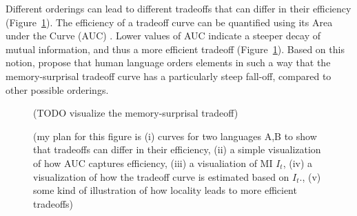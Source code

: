 \documentclass[11pt,letterpaper]{article}
\newcommand{\citet}{\Textcite}
\newcommand\mhahn[1]{{\color{red}(#1)}}
\begin{document}
Different orderings can lead to different tradeoffs that can differ in their efficiency (Figure~\ref{fig:tradeoff}).
The efficiency of a tradeoff curve can be quantified using its Area under the Curve (AUC) \citet{Hahn2020modeling}. Lower values of AUC indicate a steeper decay of mutual information, and thus a more efficient tradeoff (Figure~\ref{fig:tradeoff}).
Based on this notion, \citet{Hahn2020modeling} propose that human language orders elements in such a way that the memory-surprisal tradeoff curve has a particularly steep fall-off, compared to other possible orderings.

\begin{figure}
    \centering
    \mhahn{TODO visualize the memory-surprisal tradeoff}
    \caption{\mhahn{my plan for this figure is (i) curves for two languages A,B to show that tradeoffs can differ in their efficiency, (ii) a simple visualization of how AUC captures efficiency, (iii) a visualiation of MI $I_t$, (iv) a visualization of how the tradeoff curve is estimated based on $I_t$., (v) some kind of illustration of how locality leads to more efficient tradeoffs}}
    \label{fig:tradeoff}
\end{figure}
\end{document}
